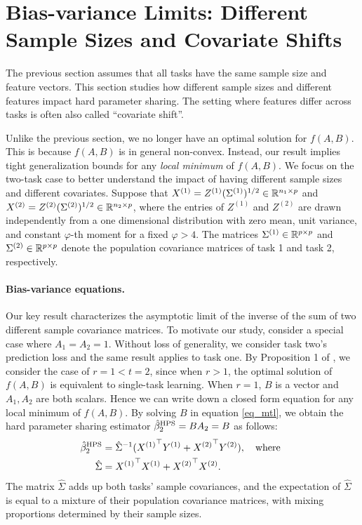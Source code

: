 \section{Bias-variance Limits: Different Sample Sizes and Covariate Shifts}\label{sec_diff}

The previous section assumes that all tasks have the same sample size and feature vectors.
This section studies how different sample sizes and different features impact hard parameter sharing.
The setting where features differ across tasks is often also called ``covariate shift''.

Unlike the previous section, we no longer have an optimal solution for $f(A, B)$.
This is because $f(A, B)$ is in general non-convex.
Instead, our result implies tight generalization bounds for any \emph{local minimum} of $f(A, B)$.
We focus on the two-task case to better understand the impact of having different sample sizes and different covariates.
Suppose that $X^{(1)} = Z^{(1)}(\Sigma^{(1)})^{1/2} \in \mathbb{R}^{n_1 \times p}$ and $X^{(2)} = Z^{(2)}(\Sigma^{(2)})^{1/2} \in \mathbb{R}^{n_2 \times p}$, where the entries of $Z^{(1)}$ and $ Z^{(2)}$ are drawn independently from a one dimensional distribution with zero mean, unit variance, and constant $\varphi$-th moment for a fixed $\varphi > 4$. The matrices $\Sigma^{(1)}\in \mathbb{R}^{p\times p}$ and $\Sigma^{(2)}\in \mathbb{R}^{p\times p}$ denote the population covariance matrices of task 1 and task 2, respectively.

\paragraph{Bias-variance equations.}
Our key result characterizes the asymptotic limit of the inverse of the sum of two different sample covariance matrices.
To motivate our study, consider a special case where $A_1=A_2=1$. 
Without loss of generality, we consider task two's prediction loss and the same result applies to task one.
By Proposition 1 of \citet{WZR20}, we consider the case of $r = 1 < t = 2$, since when $r > 1$, the optimal solution of $f(A, B)$ is equivalent to single-task learning.
When $r = 1$, $B$ is a vector and $A_1, A_2$ are both scalars.
Hence we can write down a closed form equation for any local minimum of $f(A, B)$.
By solving $B$ in equation \eqref{eq_mtl}, we obtain the hard parameter sharing estimator $\hat{\beta}_2^{\textup{HPS}} = B A_2 = B$ as follows:
\begin{align}
	\hat{\beta}_2^{\textup{HPS}} &= {\hat{\Sigma}}^{-1} ({X^{(1)}}^{\top} Y^{(1)} + {X^{(2)}}^{\top} Y^{(2)}), \ \ \text{ where } \nonumber \\
	\hat{\Sigma} &= {X^{(1)}}^{\top} X^{(1)} + {X^{(2)}}^{\top} X^{(2)}. \label{def hatsig}
\end{align}
The matrix $\hat{\Sigma}$ adds up both tasks' sample covariances, and the expectation of $\hat{\Sigma}$ is equal to a mixture of their population covariance matrices, with mixing proportions determined by their sample sizes.

